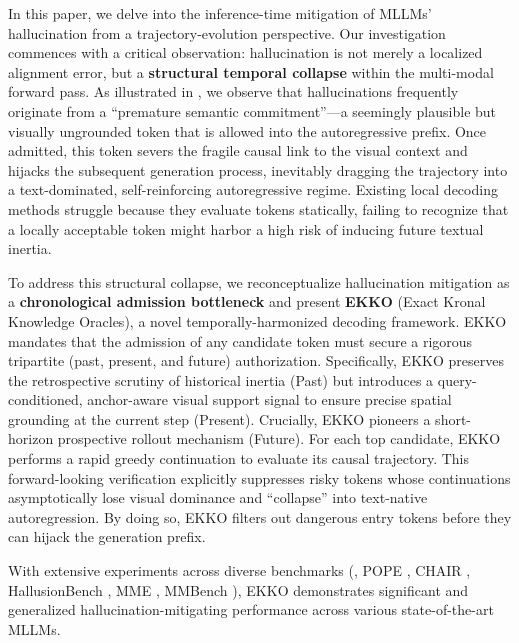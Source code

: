\label{fig:intro2collapse}

In this paper, we delve into the inference-time mitigation of MLLMs' hallucination from a trajectory-evolution perspective. Our investigation commences with a critical observation: hallucination is not merely a localized alignment error, but a \textbf{structural temporal collapse} within the multi-modal forward pass. As illustrated in , we observe that hallucinations frequently originate from a ``premature semantic commitment''---a seemingly plausible but visually ungrounded token that is allowed into the autoregressive prefix. Once admitted, this token severs the fragile causal link to the visual context and hijacks the subsequent generation process, inevitably dragging the trajectory into a text-dominated, self-reinforcing autoregressive regime. Existing local decoding methods struggle because they evaluate tokens statically, failing to recognize that a locally acceptable token might harbor a high risk of inducing future textual inertia.

\label{fig:method_pipeline}

To address this structural collapse, we reconceptualize hallucination mitigation as a \textbf{chronological admission bottleneck} and present \textbf{EKKO} (Exact Kronal Knowledge Oracles), a novel temporally-harmonized decoding framework. EKKO mandates that the admission of any candidate token must secure a rigorous tripartite (past, present, and future) authorization.
Specifically, EKKO preserves the retrospective scrutiny of historical inertia (Past) \cite{huang2024opera_cvpr} but introduces a query-conditioned, anchor-aware visual support signal to ensure precise spatial grounding at the current step (Present).
Crucially, EKKO pioneers a short-horizon prospective rollout mechanism (Future). For each top candidate, EKKO performs a rapid greedy continuation to evaluate its causal trajectory. This forward-looking verification explicitly suppresses risky tokens whose continuations asymptotically lose visual dominance and ``collapse'' into text-native autoregression. By doing so, EKKO filters out dangerous entry tokens before they can hijack the generation prefix.

With extensive experiments across diverse benchmarks (\eg, POPE \cite{li2023pope}, CHAIR \cite{rohrbach2018object}, HallusionBench \cite{guan2024hallusionbench}, MME \cite{fu2023mme}, MMBench \cite{liu2023mmbench}), EKKO demonstrates significant and generalized hallucination-mitigating performance across various state-of-the-art MLLMs.

